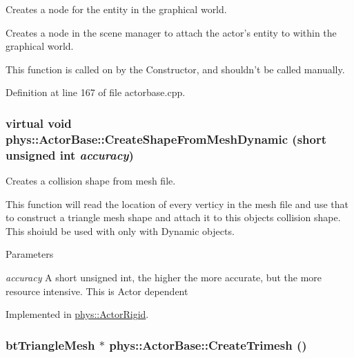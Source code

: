 Creates a node for the entity in the graphical world. 

Creates a node in the scene manager to attach the actor's entity to within the graphical world. \par
 This function is called on by the Constructor, and shouldn't be called manually. 

Definition at line 167 of file actorbase.cpp.

\hypertarget{classphys_1_1ActorBase_aa41370f6d2031a9dad8df45bd7f3bcc6}{
\subsubsection[{CreateShapeFromMeshDynamic}]{\setlength{\rightskip}{0pt plus 5cm}virtual void phys::ActorBase::CreateShapeFromMeshDynamic (short unsigned int {\em accuracy})}}
\label{d8/d0f/classphys_1_1ActorBase_aa41370f6d2031a9dad8df45bd7f3bcc6}


Creates a collision shape from mesh file. 

This function will read the location of every verticy in the mesh file and use that to construct a triangle mesh shape and attach it to this objects collision shape. This shoiuld be used with only with Dynamic objects. 
\begin{DoxyParams}{Parameters}
\item[{\em accuracy}]A short unsigned int, the higher the more accurate, but the more resource intensive. This is Actor dependent \end{DoxyParams}


Implemented in \hyperlink{classphys_1_1ActorRigid_aab4a408ce0724be6adf4c9f51f55f8a1}{phys::ActorRigid}.

\hypertarget{classphys_1_1ActorBase_a4d2137276c50bbe5bc8cf9ecc66581b7}{
\subsubsection[{CreateTrimesh}]{\setlength{\rightskip}{0pt plus 5cm}btTriangleMesh $\ast$ phys::ActorBase::CreateTrimesh ()}}
\label{d8/d0f/classphys_1_1ActorBase_a4d2137276c50bbe5bc8cf9ecc66581b7}


